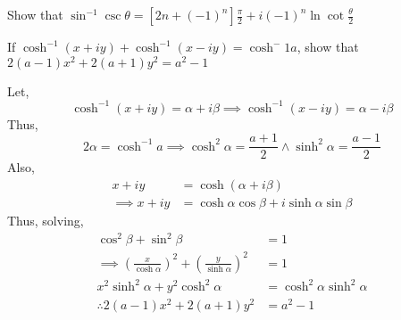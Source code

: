 \begin{asign}
	Show that $\sin^{-1}\csc\theta=[2n+(-1)^n]\frac{\pi}{2}+i(-1)^n\ln\cot\frac{\theta}{2}$
\end{asign}
\begin{asign}
	If $\cosh^{-1}(x+iy)+\cosh^{-1}(x-iy)=\cosh^-1a$, show that $2(a-1)x^2+2(a+1)y^2=a^2-1$
\end{asign}
\begin{anse}
	Let,
	\[\cosh^{-1}(x+iy)=\alpha+i\beta \implies\cosh^{-1}(x-iy)=\alpha-i\beta\]
	Thus,
	\[2\alpha=\cosh^{-1}a\implies \cosh^2\alpha=\frac{a+1}{2} \land \sinh^2\alpha=\frac{a-1}{2}\]
	Also,
	\[\begin{split}
		x+iy&=\cosh(\alpha+i\beta)\\
		\implies x+iy&=\cosh\alpha\cos\beta+i\sinh\alpha\sin\beta
	\end{split}\]
	Thus, solving,
	\[\begin{split}
		\cos^2\beta+\sin^2\beta&=1\\
		\implies \left(\frac{x}{\cosh\alpha}\right)^2+ \left(\frac{y}{\sinh\alpha}\right)^2&=1\\
		x^2\sinh^2\alpha+y^2\cosh^2\alpha&=\cosh^2\alpha\sinh^2\alpha\\
		\therefore 2(a-1)x^2+2(a+1)y^2&=a^2-1
	\end{split}\]
\end{anse}








